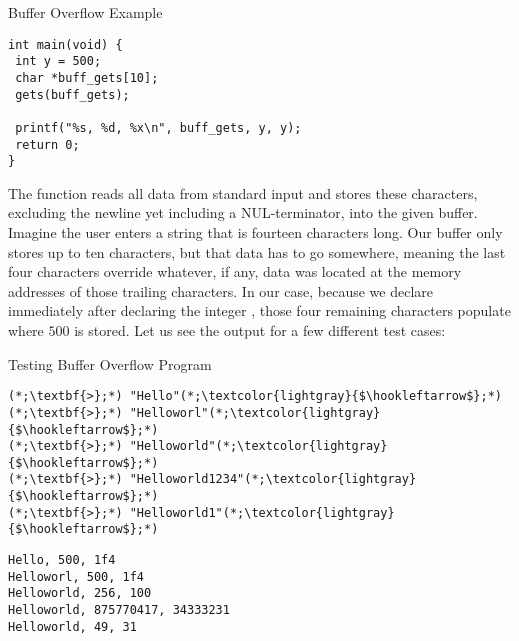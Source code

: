 \begin{cl}[]{Buffer Overflow Example}
\begin{lstlisting}[language=MyC]
int main(void) {
 int y = 500;
 char *buff_gets[10];
 gets(buff_gets);

 printf("%s, %d, %x\n", buff_gets, y, y);
 return 0;
}
\end{lstlisting}
\end{cl}
The  function reads all data from standard input and stores these characters, excluding the newline yet including a NUL-terminator, into the given buffer. Imagine the user enters a string that is fourteen characters long. Our  buffer only stores up to ten characters, but that data has to go somewhere, meaning the last four characters override whatever, if any, data was located at the memory addresses of those trailing characters. In our case, because we declare  immediately after declaring the integer , those four remaining characters populate where $500$ is stored. Let us see the output for a few different test cases:

\begin{cloast}[]{Testing Buffer Overflow Program}
\begin{lstlisting}[language=MySOutput]
(*;\textbf{>};*) "Hello"(*;\textcolor{lightgray}{$\hookleftarrow$};*)
(*;\textbf{>};*) "Helloworl"(*;\textcolor{lightgray}{$\hookleftarrow$};*)
(*;\textbf{>};*) "Helloworld"(*;\textcolor{lightgray}{$\hookleftarrow$};*)
(*;\textbf{>};*) "Helloworld1234"(*;\textcolor{lightgray}{$\hookleftarrow$};*)
(*;\textbf{>};*) "Helloworld1"(*;\textcolor{lightgray}{$\hookleftarrow$};*)
\end{lstlisting}
\tcblower
\begin{lstlisting}[language=MyOutput]
Hello, 500, 1f4
Helloworl, 500, 1f4
Helloworld, 256, 100
Helloworld, 875770417, 34333231
Helloworld, 49, 31
\end{lstlisting}
\end{cloast}

